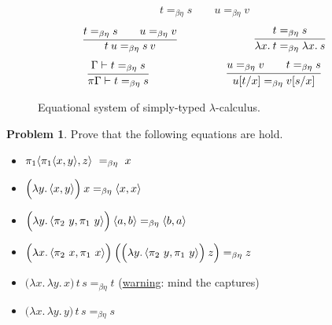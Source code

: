 \documentclass[a4paper, 11pt]{article}
\theoremstyle{definition}
\newtheorem{problem}{Problem}
\begin{document}
\begin{figure}[h]
\begin{minipage}{1\textwidth}
\begin{align*}
{                          t =_{\beta \eta} s
                          \qquad
                          u =_{\beta \eta} v
                  }
        \end{align*}
        \begin{align*}
                \infer{ t \> u =_{\beta \eta} s \> v }{
                          t =_{\beta \eta} s
                          \qquad
                          u =_{\beta \eta} v
                  }
                \hspace{2.5cm}
                \infer {\lambda x. \> t =_{\beta \eta} \lambda x. \> s}{
                        t =_{\beta \eta} s
                }
        \end{align*}
        \begin{align*}
                \infer{
                        \pi \Gamma \vljud t =_{\beta \eta}  s
                }{
                        \Gamma \vljud t =_{\beta \eta} s
                }
                \hspace{2.5cm}
                \infer{
                        u[t/x] =_{\beta \eta} v[s/x]
                }{
                        u =_{\beta \eta} v \qquad t =_{\beta \eta} s
                }
        \end{align*}
\end{minipage}
\caption{Equational system of simply-typed $\lambda$-calculus.}
\label{fig:eq_lambda_calc2}
\end{figure}


\begin{problem}
        \label{probl}
        Prove that the following equations are hold.
        \begin{itemize}
                \item $\pi_1 \pv{\pi_1 \pv{x}{y}}{z}\ =_{\beta \eta}\ x$ 
                \item $\Big ( \lambda y. \, \langle x, y \rangle \Big ) \> x =_{\beta \eta} \langle x, x \rangle$
                \item $\Big ( \lambda y.\, \pv{\pi_2\ y}{\pi_1\ y} \Big )\>  \pv{a}{b} 
                        =_{\beta \eta} \pv{b}{a}$
                \item $\Big ( \lambda x.\, \pv{\pi_2\ x}{\pi_1\ x} \Big )\> 
                      \Big ( \Big ( \lambda y.\, \pv{\pi_2\ y}{\pi_1\ y} \Big ) \> z \Big ) 
                        =_{\beta \eta} z$
                \item $\Big ( \lambda x. \, \lambda y. \, x \Big ) \, t \, s =_{\beta \eta} t$
                        {\small (\underline{warning}: mind the captures) }
                \item $\Big ( \lambda x. \, \lambda y. \, y \Big ) \, t \, s =_{\beta \eta} s$
        \end{itemize}
\end{problem}
\end{document}

